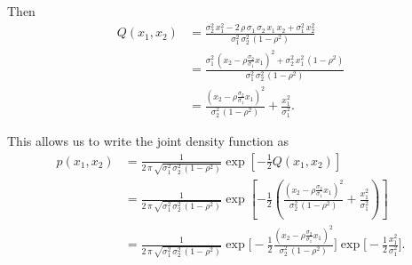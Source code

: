 \documentclass[
  letterpaper,
  DIV=11,
  numbers=noendperiod]{scrartcl}
\begin{document}
Then \begin{align*}
Q ( x_{1}, x_{2} )
&=
\frac{
    \sigma_{2}^{2} \, x_{1}^{2}
  - 2 \, \rho \, \sigma_{1} \, \sigma_{2} \, x_{1} \, x_{2}
  + \sigma_{1}^{2} \, x_{2}^{2}
}{
  \sigma_{1}^{2} \, \sigma_{2}^{2} \, (1 - \rho^{2} )
}
\\
&=
\frac{
  \sigma_{1}^{2} \,
  \left(
    x_{2} - \rho \frac{ \sigma_{2} }{ \sigma_{1} } x_{1}
  \right)^{2}
  +
  \sigma_{2}^{2} \, x_{1}^{2} \, (1 - \rho^{2} )
}{
  \sigma_{1}^{2} \, \sigma_{2}^{2} \, (1 - \rho^{2} )
}
\\
&=
\frac{
  \left(
    x_{2} - \rho \frac{ \sigma_{2} }{ \sigma_{1} } x_{1}
  \right)^{2}
}{
  \sigma_{2}^{2} \, (1 - \rho^{2} )
}
+
\frac{  x_{1}^{2} }{ \sigma_{1}^{2} }.
\end{align*}

This allows us to write the joint density function as \begin{align*}
p( x_{1}, x_{2} )
&=
\frac{1}{
  2 \, \pi \,
  \sqrt{ \sigma_{1}^{2} \, \sigma_{2}^{2} \, (1 - \rho^{2} ) }
}
\exp \left[
  -\frac{1}{2} Q( x_{1}, x_{2} )
\right]
\\
&=
\frac{1}{
  2 \, \pi \,
  \sqrt{ \sigma_{1}^{2} \, \sigma_{2}^{2} \, (1 - \rho^{2} ) }
}
\exp \left[
  -\frac{1}{2} \left(
      \frac{
      \left(
        x_{2} - \rho \frac{ \sigma_{2} }{ \sigma_{1} } x_{1}
      \right)^{2}
    }{
      \sigma_{2}^{2} \, (1 - \rho^{2} )
    }
    +
    \frac{  x_{1}^{2} }{ \sigma_{1}^{2} }
  \right)
\right]
\\
&=
\frac{1}{
  2 \, \pi \,
  \sqrt{ \sigma_{1}^{2} \, \sigma_{2}^{2} \, (1 - \rho^{2} ) }
}
\exp \Bigg[
  -\frac{1}{2}
      \frac{
      \left(
        x_{2} - \rho \frac{ \sigma_{2} }{ \sigma_{1} } x_{1}
      \right)^{2}
    }{
      \sigma_{2}^{2} \, (1 - \rho^{2} )
    }
\Bigg]
\exp \Bigg[
  -\frac{1}{2} \frac{  x_{1}^{2} }{ \sigma_{1}^{2} }
\Bigg].
\end{align*}
\end{document}
